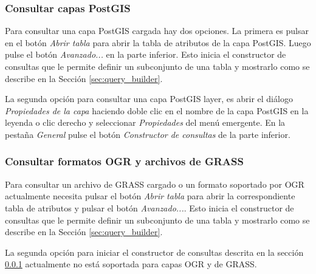 \subsubsection{Consultar capas PostGIS}\label{sec:query_builder_postgis}

Para consultar una capa PostGIS cargada hay dos opciones. La primera es pulsar en el botón \textit{Abrir tabla} para abrir la tabla de atributos de la capa PostGIS. Luego pulse el botón \textit{Avanzado...} en la parte inferior. Esto inicia el constructor de consultas que le permite definir un subconjunto de una tabla y mostrarlo como se describe en la Sección \ref{sec:query_builder}.

La segunda opción para consultar una capa PostGIS layer, es abrir el diálogo \textit{Propiedades de la capa} haciendo doble clic en el nombre de la capa PostGIS en la leyenda o clic derecho y seleccionar \textit{Propiedades} del menú emergente. En la pestaña \textit{General} pulse el botón \textit{Constructor de consultas} de la parte inferior.

\subsubsection{Consultar formatos OGR y archivos de GRASS}\label{sec:query_builder_ogrgrass}

Para consultar un archivo de GRASS cargado o un formato soportado por OGR actualmente necesita pulsar el botón \textit{Abrir tabla} para abrir la correspondiente tabla de atributos y pulsar el botón \textit{Avanzado...}. Esto inicia el constructor de consultas que le permite definir un subconjunto de una tabla y mostrarlo como se describe en la Sección \ref{sec:query_builder}. 

La segunda opción para iniciar el constructor de consultas descrita en la sección \ref{sec:query_builder_postgis} actualmente no está soportada para capas OGR y de GRASS.

